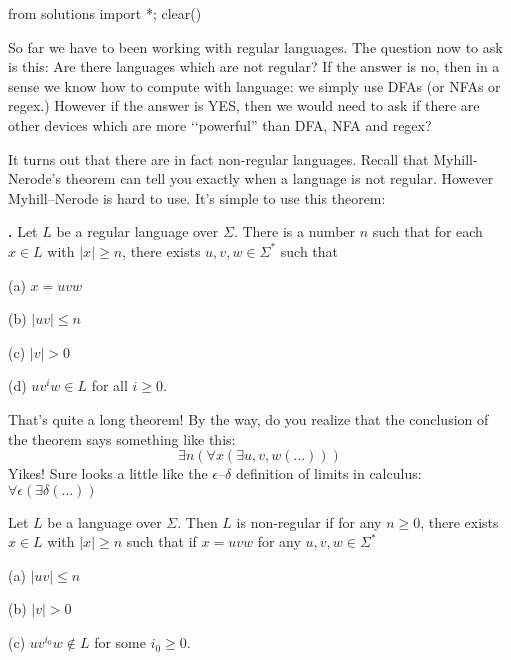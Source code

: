\begin{python0}
  from solutions import *; clear()
\end{python0}

So far we have to been working 
with regular languages.
The question now to ask is this:
Are there languages which are not regular?
If the answer is no, then in a sense we know how to compute with language:
we simply use DFAs (or NFAs or regex.)
However if the answer is YES, then we would need to ask if there are other
devices which are more \lq\lq powerful'' than
DFA, NFA and regex?

It turns out that there are in fact non-regular languages.
Recall that Myhill-Nerode's theorem can tell you exactly
when a language is not regular.
However Myhill--Nerode is hard to use.
It's simple to use this theorem:

\begin{thm}\textbf{.}
Let $L$ be a regular language over $\Sigma$. There is a number $n$
such that for each $x \in L$ with $|x| \geq n$, there exists $u,v,w
\in \Sigma^*$ such that
\begin{tightlist}
  \item[\textnormal{(a)}] $x = uvw$
  \item[\textnormal{(b)}] $|uv| \leq n$
  \item[\textnormal{(c)}] $|v| > 0$
  \item[\textnormal{(d)}] $uv^iw \in L$ for all $i \geq 0$.
\end{tightlist}
\end{thm}

That's quite a long theorem!
By the way, do you realize that the conclusion of the theorem
says something like this:
\[
\exists n \left( \forall x \left( \exists u,v,w (...) \right) \right)
\]
Yikes!
Sure looks a little like the $\epsilon$--$\delta$ definition
of limits in calculus:
$\forall \epsilon ( \exists \delta (...))$

\begin{cor}
Let $L$ be a language over $\Sigma$. Then $L$ is non-regular if for
any $n \geq 0$, there exists $x \in L$ with $|x| \geq n$ such
that if $x=uvw$ for any $u,v,w \in \Sigma^*$
 \begin{tightlist}
  \item[\textnormal{(a)}] $|uv| \leq n$
  \item[\textnormal{(b)}] $|v| > 0$
  \item[\textnormal{(c)}] $uv^{i_0}w \notin L$ for some $i_0 \geq 0$.
 \end{tightlist}
\end{cor}

